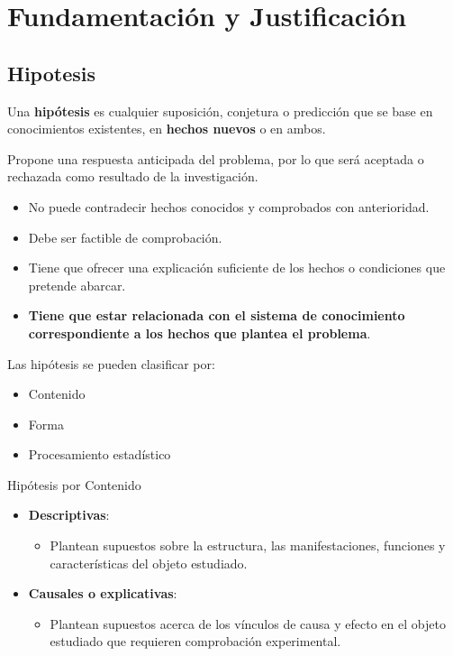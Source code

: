 \documentclass[letter,12pt]{report}
\newcommand\naranjo[1]{\textcolor[rgb]{1.00,0.36,0.06}{\textbf{#1}}}
\begin{document}
\chapter{Fundamentación y Justificación}
\section{Hipotesis}
Una \naranjo{hipótesis} es cualquier suposición, conjetura o predicción que se base en conocimientos existentes, en \naranjo{hechos nuevos} o en ambos.

 Propone una respuesta anticipada del problema, por lo que será aceptada o rechazada como resultado de la investigación.

\begin{itemize}
  \item No puede contradecir hechos conocidos y comprobados con anterioridad.
  \item Debe ser factible de comprobación.
  \item Tiene que ofrecer una explicación suficiente de los hechos o condiciones que pretende abarcar.
  \item \naranjo{Tiene que estar relacionada con el sistema de conocimiento correspondiente a los hechos que plantea el problema}.
\end{itemize}

Las hipótesis se pueden clasificar por:
 \begin{itemize}
  \item Contenido
  \item Forma
  \item Procesamiento estadístico
\end{itemize}

Hipótesis por Contenido
\begin{itemize}
  \item \textbf{Descriptivas}:
  \begin{itemize}
  \item Plantean supuestos sobre la estructura, las manifestaciones, funciones y características del objeto estudiado.
\end{itemize}

  \item \textbf{Causales o explicativas}:
  \begin{itemize}
  \item Plantean supuestos acerca de los vínculos de causa y efecto en el objeto estudiado que requieren comprobación experimental.
\end{itemize}

\end{itemize}
\end{document}
